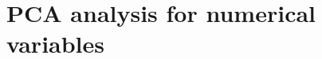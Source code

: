 

\section{PCA analysis for numerical variables}%
\label{sec:pca_analysis_for_numerical_variables}










